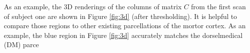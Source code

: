 \documentclass[fleqn]{article}
\let\oldref\ref
\renewcommand{\ref}[1]{(\oldref{#1})}
\begin{document}
As an example, the 3D renderings of the columns of matrix $C$ from the first scan of subject one are shown in Figure \oldref{fig:3d} (after thresholding). 
It is helpful to compare those regions to other existing parcellations of the mortor cortex. As an example, the blue region in Figure \oldref{fig:3d} accurately matches the dorselmedical (DM) parce
\end{document}
